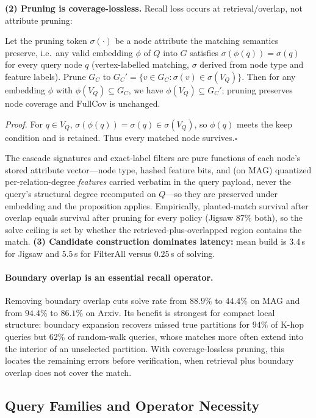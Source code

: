 \documentclass[sigconf, nonacm]{acmart}
\begin{document}
\textbf{(2) Pruning is coverage-lossless.} Recall loss occurs at retrieval/overlap, not attribute pruning:

\begin{proposition}
\label{prop:lossless}
Let the pruning token $\sigma(\cdot)$ be a node attribute the matching semantics preserve, i.e.\ any valid embedding $\phi$ of $Q$ into $G$ satisfies $\sigma(\phi(q))=\sigma(q)$ for every query node $q$ (vertex-labelled matching, $\sigma$ derived from node type and feature labels). Prune $G_C$ to $G_C'=\{v\in G_C : \sigma(v)\in \sigma(V_Q)\}$. Then for any embedding $\phi$ with $\phi(V_Q)\subseteq G_C$, we have $\phi(V_Q)\subseteq G_C'$; pruning preserves node coverage and $\mathrm{FullCov}$ is unchanged.
\end{proposition}
\emph{Proof.} For $q\in V_Q$, $\sigma(\phi(q))=\sigma(q)\in\sigma(V_Q)$, so $\phi(q)$ meets the keep condition and is retained. Thus every matched node survives.\hfill$\square$

The cascade signatures and exact-label filters are pure functions of each node's stored attribute vector---node type, hashed feature bits, and (on MAG) quantized per-relation-degree \emph{features} carried verbatim in the query payload, never the query's structural degree recomputed on $Q$---so they are preserved under embedding and the proposition applies. Empirically, planted-match survival after overlap equals survival after pruning for every policy (Jigsaw $87\%$ both), so the solve ceiling is set by whether the retrieved-plus-overlapped region contains the match. \textbf{(3) Candidate construction dominates latency:} mean build is $3.4$\,s for Jigsaw and $5.5$\,s for FilterAll versus $0.25$\,s of solving.

\paragraph{Boundary overlap is an essential recall operator.}
Removing boundary overlap cuts solve rate from $88.9\%$ to $44.4\%$ on MAG and from $94.4\%$ to $86.1\%$ on Arxiv. Its benefit is strongest for compact local structure: boundary expansion recovers missed true partitions for $94\%$ of K-hop queries but $62\%$ of random-walk queries, whose matches more often extend into the interior of an unselected partition. With coverage-lossless pruning, this locates the remaining errors before verification, when retrieval plus boundary overlap does not cover the match.

\subsection{Query Families and Operator Necessity}
\label{sec:family}
\end{document}
